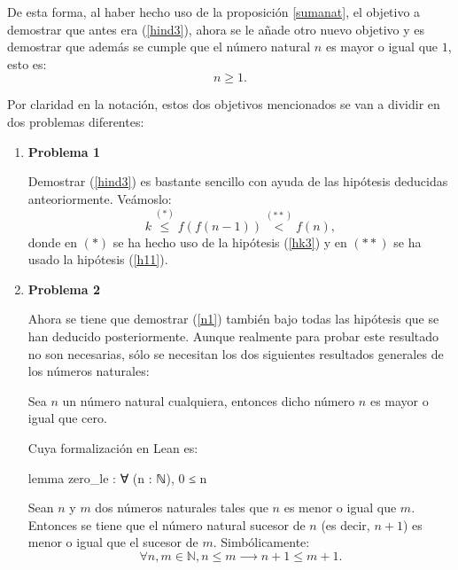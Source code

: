 \begin{demostracion}
\begin{itemize}
      De esta forma, al haber hecho uso de la proposición \ref{sumanat}, el objetivo a demostrar que antes era (\ref{hind3}), ahora se
      le añade otro nuevo objetivo y es demostrar que además se
      cumple que el número natural \(n\) es mayor o igual que \(1\),
      esto es:
      \begin{equation}\label{n1}
        n≥1.
      \end{equation}

      Por claridad en la notación, estos dos objetivos mencionados
      se van a dividir en dos problemas diferentes:
      \begin{enumerate}
      \item \textbf{Problema 1}

        Demostrar (\ref{hind3}) es bastante sencillo con ayuda de
        las hipótesis deducidas anteoriormente. Veámoslo:
        \begin{equation}
          k\stackrel{(*)}{≤}f(f(n-1))\stackrel{(**)}{<}f(n),
        \end{equation}
        donde en \((*)\) se ha hecho uso de la hipótesis (\ref{hk3})
        y en \((**)\) se ha usado la hipótesis (\ref{h11}).

      \item \textbf{Problema 2}

        Ahora se tiene que demostrar (\ref{n1}) también bajo todas
        las hipótesis que se han deducido posteriormente. Aunque
        realmente para probar este resultado no son necesarias,
        sólo se necesitan los dos siguientes resultados generales
        de los números naturales:

        \begin{lema}\label{lemaNatCero}
          Sea \(n\) un número natural cualquiera, entonces dicho
          número \(n\) es mayor o igual que cero.
        \end{lema}

        Cuya formalización en Lean es:
        \begin{leancode}
          lemma zero_le : ∀ (n : ℕ), 0 ≤ n
        \end{leancode}

        \begin{lema}\label{lemaNatSuc}
          Sean \(n\) y \(m\) dos números naturales tales que \(n\)
          es menor o igual que \(m\). Entonces se tiene que el
          número natural sucesor de \(n\) (es decir, \(n+1\)) es
          menor o igual que el sucesor de \(m\). Simbólicamente:
          \begin{equation}
            ∀n,m ∈ ℕ, n≤m ⟶ n+1≤m+1.
          \end{equation}
        \end{lema}


\end{enumerate}
\end{itemize}
\end{demostracion}
